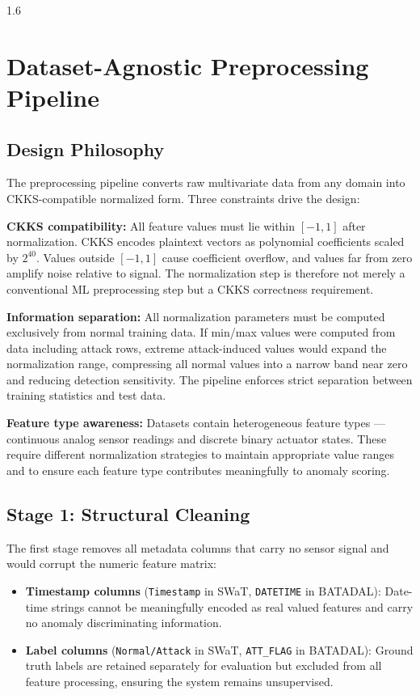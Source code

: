 \begin{spacing}{1.6}
    
\end{spacing}

\section{Dataset-Agnostic Preprocessing Pipeline}

\subsection{Design Philosophy}

The preprocessing pipeline converts raw multivariate data from any domain into
CKKS-compatible normalized form. Three constraints drive the design:

\textbf{CKKS compatibility:} All feature values must lie within $[-1, 1]$ after
normalization. CKKS encodes plaintext vectors as polynomial coefficients scaled
by $2^{40}$. Values outside $[-1, 1]$ cause coefficient overflow, and values
far from zero amplify noise relative to signal. The normalization step is
therefore not merely a conventional ML preprocessing step but a CKKS correctness
requirement.

\textbf{Information separation:} All normalization parameters must be computed
exclusively from normal training data. If min/max values were computed from
data including attack rows, extreme attack-induced values would expand the
normalization range, compressing all normal values into a narrow band near zero
and reducing detection sensitivity. The pipeline enforces strict separation
between training statistics and test data.

\textbf{Feature type awareness:} Datasets contain heterogeneous feature types
--- continuous analog sensor readings and discrete binary actuator states. These
require different normalization strategies to maintain appropriate value ranges
and to ensure each feature type contributes meaningfully to anomaly scoring.

\subsection{Stage 1: Structural Cleaning}

The first stage removes all metadata columns that carry no sensor signal and
would corrupt the numeric feature matrix:

\begin{itemize}
  \item \textbf{Timestamp columns} (\texttt{Timestamp} in SWaT,
  \texttt{DATETIME} in BATADAL): Date-time strings cannot be meaningfully
  encoded as real valued features and carry no anomaly discriminating information.
  \item \textbf{Label columns} (\texttt{Normal/Attack} in SWaT,
  \texttt{ATT\_FLAG} in BATADAL): Ground truth labels are retained separately
  for evaluation but excluded from all feature processing, ensuring the system
  remains unsupervised.
\end{itemize}

